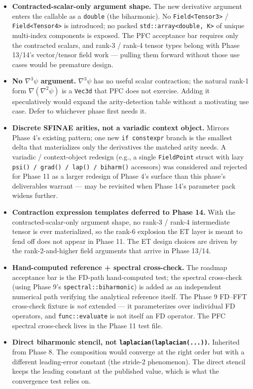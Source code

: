 \begin{itemize}
\item
  \textbf{Contracted-scalar-only argument shape.} The new derivative
  argument enters the callable as a \passthrough{\lstinline!double!}
  (the biharmonic). No \passthrough{\lstinline!Field<Tensor3>!} /
  \passthrough{\lstinline!Field<Tensor4>!} is introduced; no packed
  \passthrough{\lstinline!std::array<double, K>!} of unique
  multi-index components is exposed. The PFC acceptance bar requires
  only the contracted scalars, and rank-3 / rank-4 tensor types belong
  with Phase 13/14's vector/tensor field work --- pulling them
  forward without those use cases would be premature design.
\item
  \textbf{No \(\nabla^3\psi\) argument.} \(\nabla^3\psi\) has no
  useful scalar contraction; the natural rank-1 form
  \(\nabla(\nabla^2\psi)\) is a \passthrough{\lstinline!Vec3d!} that
  PFC does not exercise. Adding it speculatively would expand the
  arity-detection table without a motivating use case. Defer to
  whichever phase first needs it.
\item
  \textbf{Discrete SFINAE arities, not a variadic context object.}
  Mirrors Phase 4's existing pattern; one new
  \passthrough{\lstinline!if constexpr!} branch is the smallest delta
  that materializes only the derivatives the matched arity needs. A
  variadic / context-object redesign (e.g., a single
  \passthrough{\lstinline!FieldPoint!} struct with lazy
  \passthrough{\lstinline!psi() / grad() / lap() / biharm()!}
  accessors) was considered and rejected for Phase 11 as a larger
  redesign of Phase 4's surface than this phase's deliverables warrant
  --- may be revisited when Phase 14's parameter pack widens further.
\item
  \textbf{Contraction expression templates deferred to Phase 14.} With
  the contracted-scalar-only argument shape, no rank-3 / rank-4
  intermediate tensor is ever materialized, so the rank-6 explosion
  the ET layer is meant to fend off does not appear in Phase 11. The
  ET design choices are driven by the rank-2-and-higher field
  arguments that arrive in Phase 13/14.
\item
  \textbf{Hand-computed reference + spectral cross-check.} The roadmap
  acceptance bar is the FD-path hand-computed test; the spectral
  cross-check (using Phase 9's
  \passthrough{\lstinline!spectral::biharmonic!}) is added as an
  independent numerical path verifying the analytical reference itself.
  The Phase 9 FD--FFT cross-check fixture is \emph{not} extended ---
  it parameterizes over individual FD operators, and
  \passthrough{\lstinline!func::evaluate!} is not itself an FD
  operator. The PFC spectral cross-check lives in the Phase 11 test
  file.
\item
  \textbf{Direct biharmonic stencil, not
  \passthrough{\lstinline!laplacian(laplacian(...))!}.} Inherited from
  Phase 8. The composition would converge at the right order but with
  a different leading-error constant (the stride-2 phenomenon). The
  direct stencil keeps the leading constant at the published value,
  which is what the convergence test relies on.
\end{itemize}

